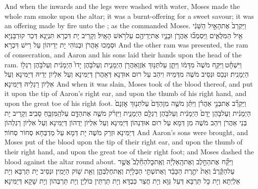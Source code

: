 {And when the inwards and the legs were washed with water, Moses made the whole ram smoke upon the altar; it was a burnt-offering for a sweet savour; it was an offering made by fire unto the \lord; as the \lord\space commanded Moses.}{}
{וַיַּקְרֵב֙ אֶת\maqqaf הָאַ֣יִל הַשֵּׁנִ֔י אֵ֖יל הַמִּלֻּאִ֑ים וַֽיִּסְמְכ֞וּ אַהֲרֹ֧ן וּבָנָ֛יו אֶת\maqqaf יְדֵיהֶ֖ם עַל\maqqaf רֹ֥אשׁ הָאָֽיִל׃}
{וְקָרֵיב יָת דִּכְרָא תִּנְיָנָא דְּכַר קוּרְבָּנַיָּא וּסְמַכוּ אַהֲרֹן וּבְנוֹהִי יָת יְדֵיהוֹן עַל רֵישׁ דִּכְרָא׃}
{And the other ram was presented, the ram of consecration, and Aaron and his sons laid their hands upon the head of the ram.}{}
{וַיִּשְׁחָ֓ט \legarmeh  וַיִּקַּ֤ח מֹשֶׁה֙ מִדָּמ֔וֹ וַיִּתֵּ֛ן עַל\maqqaf תְּנ֥וּךְ אֹֽזֶן\maqqaf אַהֲרֹ֖ן הַיְמָנִ֑ית וְעַל\maqqaf בֹּ֤הֶן יָדוֹ֙ הַיְמָנִ֔ית וְעַל\maqqaf בֹּ֥הֶן רַגְל֖וֹ הַיְמָנִֽית׃}
{וּנְכַס וּנְסֵיב מֹשֶׁה מִדְּמֵיהּ וִיהַב עַל רוּם אוּדְנָא דְּאַהֲרֹן דְּיַמִּינָא וְעַל אִלְיוֹן יְדֵיהּ דְּיַמִּינָא וְעַל אִלְיוֹן רַגְלֵיהּ דְּיַמִּינָא׃}
{And when it was slain, Moses took of the blood thereof, and put it upon the tip of Aaron’s right ear, and upon the thumb of his right hand, and upon the great toe of his right foot.}{}
{וַיַּקְרֵ֞ב אֶת\maqqaf בְּנֵ֣י אַהֲרֹ֗ן וַיִּתֵּ֨ן מֹשֶׁ֤ה מִן\maqqaf הַדָּם֙ עַל\maqqaf תְּנ֤וּךְ אׇזְנָם֙ הַיְמָנִ֔ית וְעַל\maqqaf בֹּ֤הֶן יָדָם֙ הַיְמָנִ֔ית וְעַל\maqqaf בֹּ֥הֶן רַגְלָ֖ם הַיְמָנִ֑ית וַיִּזְרֹ֨ק מֹשֶׁ֧ה אֶת\maqqaf הַדָּ֛ם עַל\maqqaf הַֽמִּזְבֵּ֖חַ סָבִֽיב׃}
{וְקָרֵיב יָת בְּנֵי אַהֲרֹן וִיהַב מֹשֶׁה מִן דְּמָא עַל רוּם אוּדְנְהוֹן דְּיַמִּינָא וְעַל אִלְיוֹן יַדְהוֹן דְּיַמִּינָא וְעַל אִלְיוֹן רַגְלְהוֹן דְּיַמִּינָא וּזְרַק מֹשֶׁה יָת דְּמָא עַל מַדְבְּחָא סְחוֹר סְחוֹר׃}
{And Aaron’s sons were brought, and Moses put of the blood upon the tip of their right ear, and upon the thumb of their right hand, and upon the great toe of their right foot; and Moses dashed the blood against the altar round about.}{}
{וַיִּקַּ֞ח אֶת\maqqaf הַחֵ֣לֶב וְאֶת\maqqaf הָֽאַלְיָ֗ה וְאֶֽת\maqqaf כׇּל\maqqaf הַחֵ֘לֶב֮ אֲשֶׁ֣ר עַל\maqqaf הַקֶּ֒רֶב֒ וְאֵת֙ יֹתֶ֣רֶת הַכָּבֵ֔ד וְאֶת\maqqaf שְׁתֵּ֥י הַכְּלָיֹ֖ת וְאֶֽת\maqqaf חֶלְבְּהֶ֑ן וְאֵ֖ת שׁ֥וֹק הַיָּמִֽין׃}
{וּנְסֵיב יָת תַּרְבָּא וְיָת אַלְיְתָא וְיָת כָּל תַּרְבָּא דְּעַל גַּוָּא וְיָת חֲצַר כַּבְדָּא וְיָת תַּרְתֵּין כּוֹלְיָן וְיָת תַּרְבְּהוֹן וְיָת שָׁקָא דְּיַמִּינָא׃}
